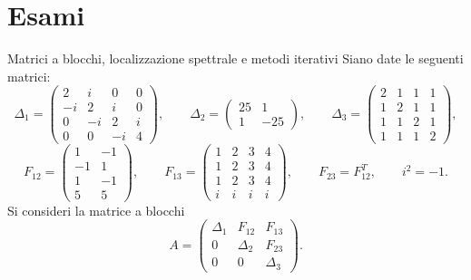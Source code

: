 \documentclass[a4paper]{article}
\begin{document}
\pagebreak

\section{Esami}

\begin{snippetexercise}{Matrici a blocchi, localizzazione spettrale e metodi iterativi}
    Siano date le seguenti matrici:
    \[
        \Delta_1=
        \begin{pmatrix}
            2 & i & 0 & 0\\
            -i & 2 & i & 0\\
            0 & -i & 2 & i\\
            0 & 0 & -i & 4
        \end{pmatrix},
        \qquad
        \Delta_2=
        \begin{pmatrix}
            25 & 1\\
            1 & -25
        \end{pmatrix},
        \qquad
        \Delta_3=
        \begin{pmatrix}
            2 & 1 & 1 & 1\\
            1 & 2 & 1 & 1\\
            1 & 1 & 2 & 1\\
            1 & 1 & 1 & 2
        \end{pmatrix},
    \]
    \[
        F_{12}=
        \begin{pmatrix}
            1 & -1\\
            -1 & 1\\
            1 & -1\\
            5 & 5
        \end{pmatrix},
        \qquad
        F_{13}=
        \begin{pmatrix}
            1 & 2 & 3 & 4\\
            1 & 2 & 3 & 4\\
            1 & 2 & 3 & 4\\
            i & i & i & i
        \end{pmatrix},
        \qquad
        F_{23}=F_{12}^T,
        \qquad
        i^2=-1.
    \]
    Si consideri la matrice a blocchi
    \[
        A=
        \begin{pmatrix}
            \Delta_1 & F_{12} & F_{13}\\
            0 & \Delta_2 & F_{23}\\
            0 & 0 & \Delta_3
        \end{pmatrix}.
    \]


\end{snippetexercise}
\end{document}
